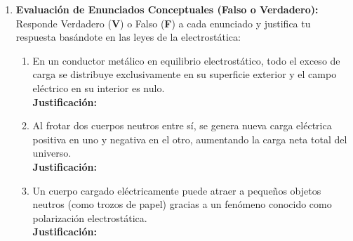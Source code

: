 \documentclass[11pt, letterpaper]{article}
\newif\ifshowanswers
\newcommand{\answer}[1]{ 
	\ifshowanswers 
	\par\vspace{0.15cm} 
	\begin{tcolorbox}[colback=blue!5!white, colframe=blue!60!white, arc=1mm, boxrule=0.5pt, title=\textbf{\footnotesize SOLUCIÓN PASO A PASO (DOCENTE)}] 
		\color{blue!80!black}\footnotesize #1 
	\end{tcolorbox} 
	\par\vspace{0.15cm} 
	\else 
	\par\vspace{0.3cm} 
	\fi 
}
\begin{document}
\begin{enumerate}[leftmargin=*, itemsep=0.8cm]
		\item \textbf{ Evaluación de Enunciados Conceptuales (Falso o Verdadero):} 
		Responde Verdadero (\textbf{V}) o Falso (\textbf{F}) a cada enunciado y justifica tu respuesta basándote en las leyes de la electrostática: 
		\begin{enumerate}[label=\alph*), itemsep=0.4cm] 
			\item \underline{\hspace{1.2cm}} En un conductor metálico en equilibrio electrostático, todo el exceso de carga se distribuye exclusivamente en su superficie exterior y el campo eléctrico en su interior es nulo. \\ \textbf{Justificación:} \underline{\hspace{13cm}} \\ \underline{\hspace{14.5cm}} 
			\item \underline{\hspace{1.2cm}} Al frotar dos cuerpos neutros entre sí, se genera nueva carga eléctrica positiva en uno y negativa en el otro, aumentando la carga neta total del universo. \\ \textbf{Justificación:} \underline{\hspace{13cm}} \\ \underline{\hspace{14.5cm}} 
			\item \underline{\hspace{1.2cm}} Un cuerpo cargado eléctricamente puede atraer a pequeños objetos neutros (como trozos de papel) gracias a un fenómeno conocido como polarización electrostática. \\ \textbf{Justificación:} \underline{\hspace{13cm}} \\ \underline{\hspace{14.5cm}} 
		\end{enumerate} 
		\answer{ 
			\textbf{a) Verdadero (V)}.\\[0.05cm] 
			\textbf{Justificación:} Las cargas de igual signo en un conductor se repelen libremente hasta alcanzar la mayor separación posible, alojándose en la superficie exterior. Como consecuencia, las cargas no se mueven y el campo eléctrico neto en el interior es cero (Efecto Jaula de Faraday).\\[0.1cm] 
			\textbf{b) Falso (F)}.\\[0.05cm] 
			\textbf{Justificación:} Por el Principio de Conservación de la Carga, la carga no se crea ni se destruye. En el frotamiento solo ocurre una transferencia de electrones de un cuerpo a otro; la carga total neta del sistema aislado sigue siendo exactamente igual a cero.\\[0.1cm] 
			\textbf{c) Verdadero (V)}.\\[0.05cm] 
			\textbf{Justificación:} El campo del objeto cargado provoca una reubicación microscópica de las cargas en las moléculas del cuerpo neutro (polarización), atrayendo las cargas de signo opuesto más cercanas a la superficie y generando una fuerza neta de atracción. 
		} 
		
	\end{enumerate} 
	
\end{document}
